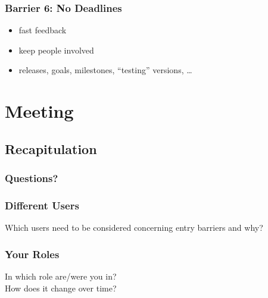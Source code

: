 \begin{frame}
	\frametitle{Barrier 6: No Deadlines}

	\begin{itemize}[<+-| alert@+>]
	\item fast feedback
	\item keep people involved
	\item releases, goals, milestones, ``testing'' versions, \dots
	\end{itemize}
\end{frame}



\section{Meeting}

\subsection{Recapitulation}

\begin{frame}
	\frametitle{Questions?}
\end{frame}


\begin{frame}
	\frametitle{Different Users}

	Which users need to be considered concerning entry barriers and why?
\end{frame}


\begin{frame}
	\frametitle{Your Roles}

	In which role are/were you in? \\
	How does it change over time?
\end{frame}

\breakframe

